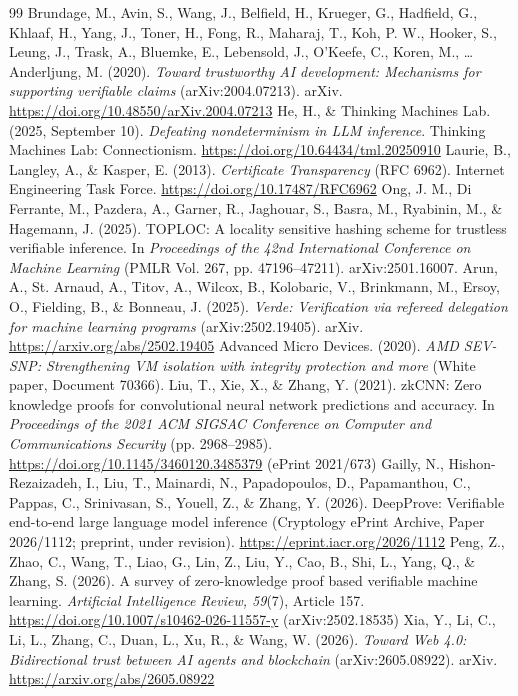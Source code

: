 \documentclass[11pt]{article}
\begin{document}
\begin{thebibliography}{99}
 Brundage, M., Avin, S., Wang, J., Belfield, H., Krueger, G., Hadfield, G., Khlaaf, H., Yang, J., Toner, H., Fong, R., Maharaj, T., Koh, P. W., Hooker, S., Leung, J., Trask, A., Bluemke, E., Lebensold, J., O'Keefe, C., Koren, M., … Anderljung, M. (2020). \emph{Toward trustworthy AI development: Mechanisms for supporting verifiable claims} (arXiv:2004.07213). arXiv. \url{https://doi.org/10.48550/arXiv.2004.07213}
 He, H., \& Thinking Machines Lab. (2025, September 10). \emph{Defeating nondeterminism in LLM inference}. Thinking Machines Lab: Connectionism. \url{https://doi.org/10.64434/tml.20250910}
 Laurie, B., Langley, A., \& Kasper, E. (2013). \emph{Certificate Transparency} (RFC 6962). Internet Engineering Task Force. \url{https://doi.org/10.17487/RFC6962}
 Ong, J. M., Di Ferrante, M., Pazdera, A., Garner, R., Jaghouar, S., Basra, M., Ryabinin, M., \& Hagemann, J. (2025). TOPLOC: A locality sensitive hashing scheme for trustless verifiable inference. In \emph{Proceedings of the 42nd International Conference on Machine Learning} (PMLR Vol. 267, pp. 47196--47211). arXiv:2501.16007.
 Arun, A., St. Arnaud, A., Titov, A., Wilcox, B., Kolobaric, V., Brinkmann, M., Ersoy, O., Fielding, B., \& Bonneau, J. (2025). \emph{Verde: Verification via refereed delegation for machine learning programs} (arXiv:2502.19405). arXiv. \url{https://arxiv.org/abs/2502.19405}
 Advanced Micro Devices. (2020). \emph{AMD SEV-SNP: Strengthening VM isolation with integrity protection and more} (White paper, Document 70366).
 Liu, T., Xie, X., \& Zhang, Y. (2021). zkCNN: Zero knowledge proofs for convolutional neural network predictions and accuracy. In \emph{Proceedings of the 2021 ACM SIGSAC Conference on Computer and Communications Security} (pp. 2968--2985). \url{https://doi.org/10.1145/3460120.3485379} (ePrint 2021/673)
 Gailly, N., Hishon-Rezaizadeh, I., Liu, T., Mainardi, N., Papadopoulos, D., Papamanthou, C., Pappas, C., Srinivasan, S., Youell, Z., \& Zhang, Y. (2026). DeepProve: Verifiable end-to-end large language model inference (Cryptology ePrint Archive, Paper 2026/1112; preprint, under revision). \url{https://eprint.iacr.org/2026/1112}
 Peng, Z., Zhao, C., Wang, T., Liao, G., Lin, Z., Liu, Y., Cao, B., Shi, L., Yang, Q., \& Zhang, S. (2026). A survey of zero-knowledge proof based verifiable machine learning. \emph{Artificial Intelligence Review, 59}(7), Article 157. \url{https://doi.org/10.1007/s10462-026-11557-y} (arXiv:2502.18535)
 Xia, Y., Li, C., Li, L., Zhang, C., Duan, L., Xu, R., \& Wang, W. (2026). \emph{Toward Web 4.0: Bidirectional trust between AI agents and blockchain} (arXiv:2605.08922). arXiv. \url{https://arxiv.org/abs/2605.08922}

\end{thebibliography}
\end{document}
